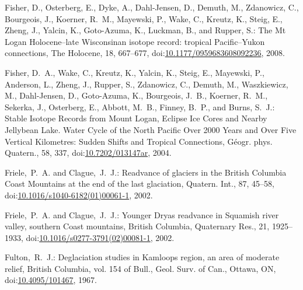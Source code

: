 \documentclass[tc, manuscript]{copernicus}
\begin{document}
\begin{thebibliography}{114}
Fisher, D., Osterberg, E., Dyke, A., Dahl-Jensen, D., Demuth, M., Zdanowicz, C., Bourgeois, J., Koerner, R.~M., Mayewski, P., Wake, C., Kreutz, K., Steig, E., Zheng, J., Yalcin, K., Goto-Azuma, K., Luckman, B., and Rupper, S.: The Mt Logan Holocene--late Wisconsinan isotope record: tropical Pacific--Yukon connections, The Holocene, 18, 667--677,
doi:\href{http://dx.doi.org/10.1177/0959683608092236}{10.1177/0959683608092236}, 2008.


Fisher, D.~A., Wake, C., Kreutz, K., Yalcin, K., Steig, E., Mayewski, P., Anderson, L., Zheng, J., Rupper, S., Zdanowicz, C., Demuth, M., Waszkiewicz, M., Dahl-Jensen, D., Goto-Azuma, K., Bourgeois, J.~B., Koerner, R.~M., Sekerka, J., Osterberg, E., Abbott, M.~B., Finney, B.~P., and Burns, S.~J.: Stable Isotope Records from Mount Logan, Eclipse Ice Cores and Nearby Jellybean Lake. Water Cycle of the North Pacific Over 2000 Years and Over Five Vertical Kilometres: Sudden Shifts and Tropical Connections, G\'{e}ogr. phys. Quatern., 58, 337,
doi:\href{http://dx.doi.org/10.7202/013147ar}{10.7202/013147ar}, 2004.


Friele,~P.~A. and Clague,~J.~J.: Readvance of glaciers in the British Columbia Coast Mountains at the end of the last glaciation, Quatern. Int., 87, 45--58,
doi:\href{http://dx.doi.org/10.1016/s1040-6182(01)00061-1}{10.1016/s1040-6182(01)00061-1}, 2002{}.


Friele,~P.~A. and Clague,~J.~J.: Younger Dryas readvance in Squamish river valley, southern Coast mountains, British Columbia, Quaternary Res., 21, 1925--1933,
doi:\href{http://dx.doi.org/10.1016/s0277-3791(02)00081-1}{10.1016/s0277-3791(02)00081-1}, 2002{}.


Fulton,~R.~J.: Deglaciation studies in Kamloops region, an area of moderate relief, British Columbia, vol. 154 of Bull., Geol. Surv. of Can., Ottawa, ON,
doi:\href{http://dx.doi.org/10.4095/101467}{10.4095/101467}, 1967.



\end{thebibliography}
\end{document}
